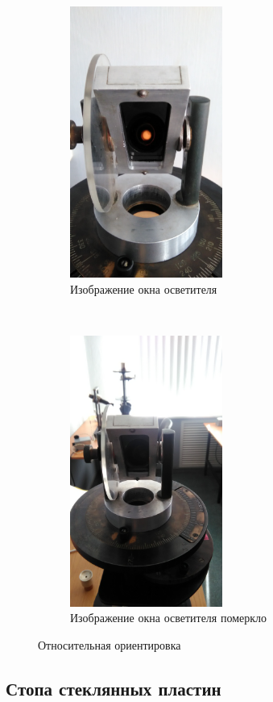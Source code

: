 \begin{figure}[h!]
    \centering
    \begin{subfigure}[c]{0.5\textwidth}
        \centering
        \includegraphics[width=5cm]{pic/b1.jpg}
		\caption{Изображение окна осветителя}
		\label{fig:figure3}
    \end{subfigure}%
    ~ 
    \begin{subfigure}[c]{0.5\textwidth}
        \centering
        \includegraphics[width=5cm]{pic/b2.jpg}
		\caption{Изображение окна осветителя померкло}
		\label{fig:figure4}
    \end{subfigure}
    \caption{Относительная ориентировка}

\end{figure} 
\subsection{Стопа стеклянных пластин}


